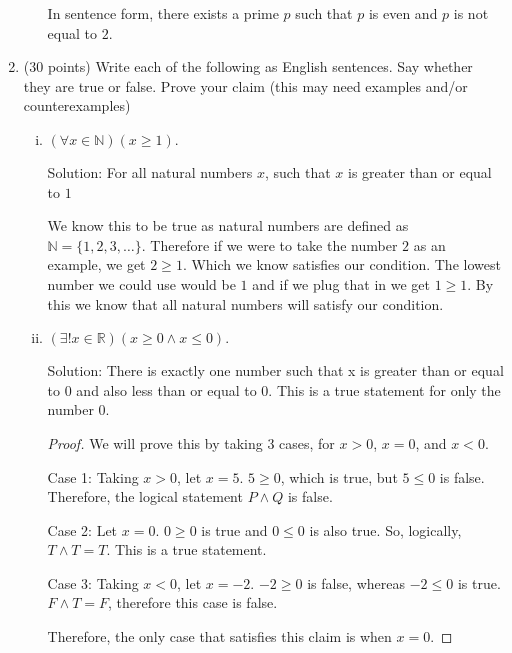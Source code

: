 \documentclass[11pt]{amsart}
\newcommand{\N}{\mathbb{N}}
\begin{document}
\begin{enumerate}
\begin{enumerate}[(i)]
In sentence form, there exists a prime $p$ such that $p$ is even and $p$ is not equal to $2$.


\end{enumerate}

\vspace{.2in}

\item (30 points) Write each of the following as English sentences. Say whether they are true or false. Prove your claim (this may need examples and/or counterexamples)
\begin{enumerate}[(i)]
\item $(\forall x\in\mathbb{N})(x \ge 1).$

Solution: For all natural numbers $x$, such that $x$ is greater than or equal to $1$

We know this to be true as natural numbers are defined as $\N = \lbrace 1,2,3,\dots \rbrace$. Therefore if we were to take the number $2$ as an example, we get $2 \ge 1$. Which we know satisfies our condition. The lowest number we could use would be $1$ and if we plug that in we get $1 \ge 1$. By this we know that all natural numbers will satisfy our condition. 

\item $(\exists! x\in\mathbb{R})(x\ge0\wedge x\leq0).$

Solution: There is exactly one number such that x is greater than or equal to $0$ and also less than or equal to $0$. This is a true statement for only the number $0$. 

\begin{proof}

We will prove this by taking 3 cases, for $x > 0$, $x = 0$, and $x < 0$.


Case 1: Taking $x > 0$, let $x = 5$. $5 \geq 0$, which is true, but $5 \leq 0$ is false. Therefore, the logical statement $P \wedge Q$ is false.

Case 2: Let $x = 0 $. $0 \geq 0$ is true and $0 \leq 0$ is also true. So, logically, $T \wedge T = T$. This is a true statement.

Case 3: Taking $x < 0$, let $x = -2$. $ -2 \geq 0$ is false, whereas $-2 \leq 0$ is true. $F \wedge T = F$, therefore this case is false.

Therefore, the only case that satisfies this claim is when $x = 0$. 
\end{proof}




\end{enumerate}
\end{enumerate}
\end{document}
